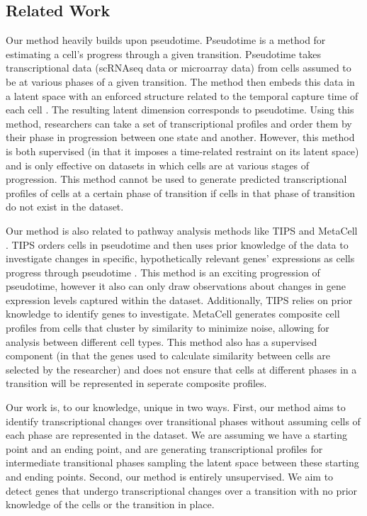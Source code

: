 \documentclass{article}
\begin{document}
\subsection{Related Work}
Our method heavily builds upon pseudotime.
Pseudotime \citep{reid_pseudotime_2016} is a method for estimating a cell's progress through a given transition.
Pseudotime takes transcriptional data (scRNAseq data or microarray data) from cells assumed to be at various phases of a given transition.
The method then embeds this data in a latent space with an enforced structure related to the temporal capture time of each cell \citep{reid_pseudotime_2016}.
The resulting latent dimension corresponds to pseudotime.
Using this method, researchers can take a set of transcriptional profiles and order them by their phase in progression between one state and another.
However, this method is both supervised (in that it imposes a time-related restraint on its latent space) and is only effective on datasets in which cells are at various stages of progression.
This method cannot be used to generate predicted transcriptional profiles of cells at a certain phase of transition if cells in that phase of transition do not exist in the dataset.

Our method is also related to pathway analysis methods like TIPS \citep{zheng_tips_2021} and MetaCell \citep{baran_metacell_2019}.
TIPS orders cells in pseudotime and then uses prior knowledge of the data to investigate changes in specific, hypothetically relevant genes' expressions as cells progress through pseudotime \citep{zheng_tips_2021}.
This method is an exciting progression of pseudotime, however it also can only draw observations about changes in gene expression levels captured within the dataset.
Additionally, TIPS relies on prior knowledge to identify genes to investigate.
MetaCell generates composite cell profiles from cells that cluster by similarity to minimize noise, allowing for analysis between different cell types.
This method also has a supervised component (in that the genes used to calculate similarity between cells are selected by the researcher) and does not ensure that cells at different phases in a transition will be represented in seperate composite profiles.

Our work is, to our knowledge, unique in two ways.
First, our method aims to identify transcriptional changes over transitional phases without assuming cells of each phase are represented in the dataset.
We are assuming we have a starting point and an ending point, and are generating transcriptional profiles for intermediate transitional phases sampling the latent space between these starting and ending points.
Second, our method is entirely unsupervised.
We aim to detect genes that undergo transcriptional changes over a transition with no prior knowledge of the cells or the transition in place.
\end{document}

